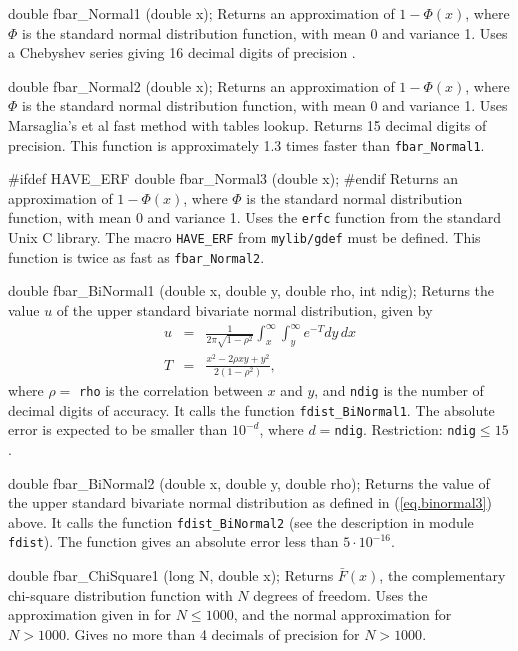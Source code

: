 double fbar_Normal1 (double x);
\endcode
  \tab  
  Returns an approximation of $1 - \Phi(x)$, 
  where $\Phi$ is the standard normal distribution function,
  with mean 0 and variance 1. 
  Uses a Chebyshev series giving 16 decimal digits of
  precision \cite{tSCH78a}.
 \endtab
\code


double fbar_Normal2 (double x);
\endcode
  \tab  
  Returns an approximation of $1 - \Phi(x)$,  where $\Phi$ is the standard
  normal distribution function, with mean 0 and variance 1. 
   Uses Marsaglia's et al \cite{rMAR94b} fast method
  with tables lookup. Returns 15 decimal digits of precision.
  This function is approximately 1.3 times faster than {\tt fbar\_Normal1}.
 \endtab
\code


#ifdef HAVE_ERF
   double fbar_Normal3 (double x);
#endif
\endcode
  \tab
  Returns an approximation of $1 - \Phi(x)$, 
  where $\Phi$ is the standard normal distribution function,
  with mean 0 and variance 1. 
  Uses the {\tt erfc} function from the standard Unix C library. The macro
  {\tt HAVE\_ERF} from {\tt mylib/gdef} must be defined. This function
  is twice as fast as {\tt fbar\_Normal2}.
 \endtab
\code


double fbar_BiNormal1 (double x, double y, double rho, int ndig);
\endcode
  \tab  
  Returns the value $u$ of the upper standard bivariate normal distribution,
  given by
\begin{eqnarray}
     u &=&  \frac{1}{2\pi\sqrt{1 - \rho^2}} \int^{\infty}_x
              \int^{\infty}_y e^{-T} dy\, dx  \label{eq.binormal3} \\[5pt]
     T &=& \frac{x^2 -2\rho x y + y^2}{2(1-\rho^2)}, \nonumber
\end{eqnarray}
  where $\rho = ${ \tt rho} is the correlation between $x$ and $y$, and
 \texttt{ndig} is the number of decimal digits of accuracy.
  It calls the function {\tt fdist\_BiNormal1}. The absolute error
  is expected to be smaller than $10^{-d}$, where $d={}$\texttt{ndig}.
  Restriction: \texttt{ndig}${} \le 15$.
 \endtab
\code


double fbar_BiNormal2 (double x, double y, double rho);
\endcode
  \tab  
  Returns the value of the upper standard bivariate normal distribution as 
  defined in (\ref{eq.binormal3}) above.
  It calls the function {\tt fdist\_BiNormal2} (see the description in
   module {\tt fdist}). The function gives
   an absolute error less than $5 \cdot 10^{-16}$. 
 \endtab
\code


double fbar_ChiSquare1 (long N, double x);
\endcode
  \tab  
    Returns $\bar F(x)$, the complementary
   chi-square distribution function with
   $N$ degrees of freedom.
  Uses the approximation given in \cite[p.116]{tKEN80a} for $N\le 1000$,
  and the normal approximation for $N > 1000$. Gives no more than 4
  decimals of precision for $N > 1000$.
 \endtab
\code


